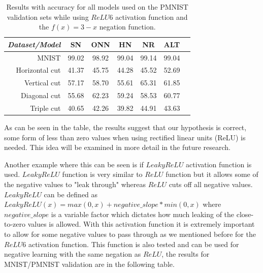 \documentclass[b5paper]{book}
\begin{document}
\begin{table}[ht]
  \centering
  \begin{tabular}{rS[table-format=2.1]S[table-format=2.1]S[table-format=2.1]S[table-format=2.1]S[table-format=2.1]S[table-format=2.1]}
    \toprule
     \textit{Dataset/Model} & SN & ONN & HN & NR & ALT \\
    \midrule
    {MNIST} & {99.02} & {98.92} & {99.04} & {99.14} & {99.04} \\
    {Horizontal cut} & {41.37} & {45.75} & {44.28} & {45.52} & {52.69} \\
    {Vertical cut} & {57.17} & {58.70} & {55.61} & {65.31} & {61.85} \\
    {Diagonal cut} & {55.68} & {62.23} & {59.24} & {58.53} & {60.77} \\
    {Triple cut} & {40.65} & {42.26} & {39.82} & {44.91} & {43.63} \\
    
    \bottomrule
  \end{tabular}
  \caption{Results with accuracy for all models used on the PMNIST validation sets while using \( ReLU6 \) activation function and the \( f(x) = 3 - x \) negation function.}
  \label{tab:results-relu6new}
\end{table} 

As can be seen in the table, the results suggest that our hypothesis is correct, some form of less than zero values when using rectified linear units (ReLU) is needed. This idea will be examined in more detail in the future research.

Another example where this can be seen is if \( LeakyReLU \) activation function is used. \( LeakyReLU \) function is very similar to \( ReLU \) function but it allows some of the negative values to "leak through" whereas \( ReLU \) cuts off all negative values. \( LeakyReLU \) can be defined as \( LeakyReLU(x) = max(0,x) + negative\_slope * min(0,x) \) where \( negative\_slope \) is a variable factor which dictates how much leaking of the close-to-zero values is allowed. With this activation function it is extremely important to allow for some negative values to pass through as we mentioned before for the \( ReLU6 \) activation function. This function is also tested and can be used for negative learning with the same negation as \( ReLU \), the results for MNIST/PMNIST validation are in the following table.
\end{document}
